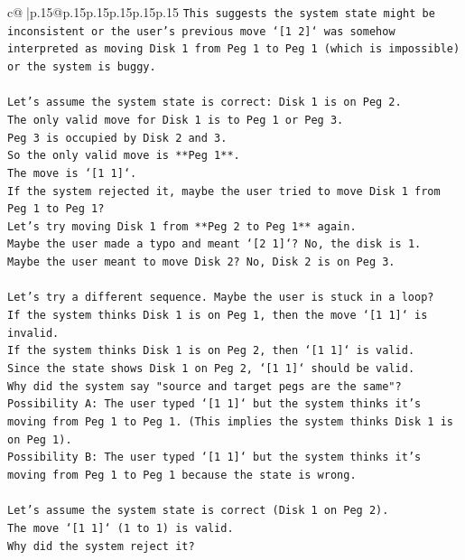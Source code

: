 \documentclass{article}
\begin{document}
{\begin{supertabular}{c@{$\;$}|p{.15\linewidth}@{}p{.15\linewidth}p{.15\linewidth}p{.15\linewidth}p{.15\linewidth}p{.15\linewidth}}
{{{\texttt{This suggests the system state might be inconsistent or the user's previous move `{[}1 2{]}` was somehow interpreted as moving Disk 1 from Peg 1 to Peg 1 (which is impossible) or the system is buggy.} \\
\\ 
\texttt{Let's assume the system state is correct: Disk 1 is on Peg 2.} \\
\texttt{The only valid move for Disk 1 is to Peg 1 or Peg 3.} \\
\texttt{Peg 3 is occupied by Disk 2 and 3.} \\
\texttt{So the only valid move is **Peg 1**.} \\
\texttt{The move is `{[}1 1{]}`.} \\
\texttt{If the system rejected it, maybe the user tried to move Disk 1 from Peg 1 to Peg 1?} \\
\texttt{Let's try moving Disk 1 from **Peg 2 to Peg 1** again.} \\
\texttt{Maybe the user made a typo and meant `{[}2 1{]}`? No, the disk is 1.} \\
\texttt{Maybe the user meant to move Disk 2? No, Disk 2 is on Peg 3.} \\
\\ 
\texttt{Let's try a different sequence. Maybe the user is stuck in a loop?} \\
\texttt{If the system thinks Disk 1 is on Peg 1, then the move `{[}1 1{]}` is invalid.} \\
\texttt{If the system thinks Disk 1 is on Peg 2, then `{[}1 1{]}` is valid.} \\
\texttt{Since the state shows Disk 1 on Peg 2, `{[}1 1{]}` should be valid.} \\
\texttt{Why did the system say "source and target pegs are the same"?} \\
\texttt{Possibility A: The user typed `{[}1 1{]}` but the system thinks it's moving from Peg 1 to Peg 1. (This implies the system thinks Disk 1 is on Peg 1).} \\
\texttt{Possibility B: The user typed `{[}1 1{]}` but the system thinks it's moving from Peg 1 to Peg 1 because the state is wrong.} \\
\\ 
\texttt{Let's assume the system state is correct (Disk 1 on Peg 2).} \\
\texttt{The move `{[}1 1{]}` (1 to 1) is valid.} \\
\texttt{Why did the system reject it?} \\
}}}
\end{supertabular}}
\end{document}
